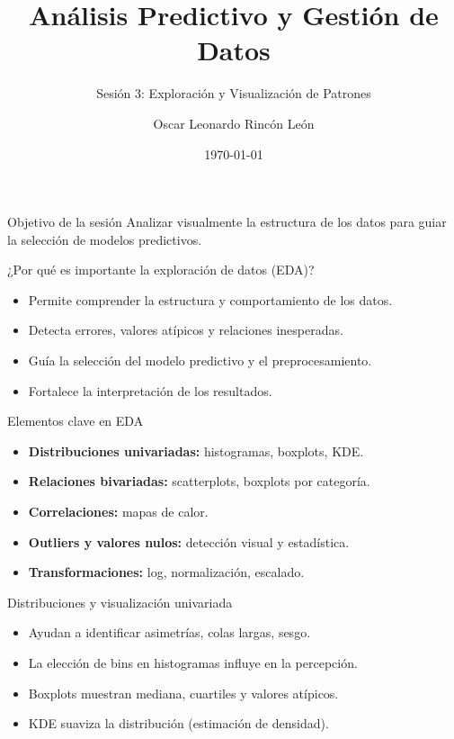 \documentclass{beamer}
\title{Análisis Predictivo y Gestión de Datos}
\subtitle{Sesión 3: Exploración y Visualización de Patrones}
\author{Oscar Leonardo Rincón León}
\date{\today}
\begin{document}
\frame{\titlepage}

\begin{frame}{Objetivo de la sesión}
Analizar visualmente la estructura de los datos para guiar la selección de modelos predictivos.
\end{frame}

\begin{frame}{¿Por qué es importante la exploración de datos (EDA)?}
\begin{itemize}
    \item Permite comprender la estructura y comportamiento de los datos.
    \item Detecta errores, valores atípicos y relaciones inesperadas.
    \item Guía la selección del modelo predictivo y el preprocesamiento.
    \item Fortalece la interpretación de los resultados.
\end{itemize}
\end{frame}

\begin{frame}{Elementos clave en EDA}
\begin{itemize}
    \item \textbf{Distribuciones univariadas:} histogramas, boxplots, KDE.
    \item \textbf{Relaciones bivariadas:} scatterplots, boxplots por categoría.
    \item \textbf{Correlaciones:} mapas de calor.
    \item \textbf{Outliers y valores nulos:} detección visual y estadística.
    \item \textbf{Transformaciones:} log, normalización, escalado.
\end{itemize}
\end{frame}

\begin{frame}{Distribuciones y visualización univariada}
\begin{itemize}
    \item Ayudan a identificar asimetrías, colas largas, sesgo.
    \item La elección de bins en histogramas influye en la percepción.
    \item Boxplots muestran mediana, cuartiles y valores atípicos.
    \item KDE suaviza la distribución (estimación de densidad).
\end{itemize}
\end{frame}
\end{document}
